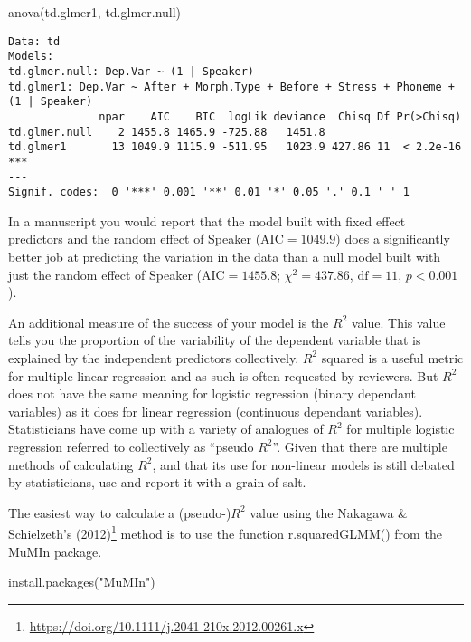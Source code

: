 \documentclass[
  10pt,
  letterpaper]{article}
\newenvironment{Shaded}{\begin{snugshade}}{\end{snugshade}}
\newcommand{\FunctionTok}[1]{\textcolor[rgb]{0.28,0.35,0.67}{#1}}
\newcommand{\NormalTok}[1]{\textcolor[rgb]{0.00,0.23,0.31}{#1}}
\newcommand{\StringTok}[1]{\textcolor[rgb]{0.13,0.47,0.30}{#1}}
\renewcommand\texttt[1]{{\ttfamily\color{BrickRed}#1}}
\DeclareRobustCommand{\href}[2]{#2\footnote{\url{#1}}}
\begin{document}
\begin{tcolorbox}
\begin{Shaded}
\begin{Highlighting}[]
\FunctionTok{anova}\NormalTok{(td.glmer1, td.glmer.null)}
\end{Highlighting}
\end{Shaded}

\begin{verbatim}
Data: td
Models:
td.glmer.null: Dep.Var ~ (1 | Speaker)
td.glmer1: Dep.Var ~ After + Morph.Type + Before + Stress + Phoneme + (1 | Speaker)
              npar    AIC    BIC  logLik deviance  Chisq Df Pr(>Chisq)    
td.glmer.null    2 1455.8 1465.9 -725.88   1451.8                         
td.glmer1       13 1049.9 1115.9 -511.95   1023.9 427.86 11  < 2.2e-16 ***
---
Signif. codes:  0 '***' 0.001 '**' 0.01 '*' 0.05 '.' 0.1 ' ' 1
\end{verbatim}

In a manuscript you would report that the model built with fixed effect
predictors and the random effect of \texttt{Speaker}
(\texttt{AIC}\(=1049.9\)) does a significantly better job at predicting
the variation in the data than a null model built with just the random
effect of \texttt{Speaker} (\texttt{AIC}\(=1455.8\); \(\chi^2=437.86\),
\(\text{df}=11\), \(p<0.001\)).

An additional measure of the success of your model is the \(R^2\) value.
This value tells you the proportion of the variability of the dependent
variable that is explained by the independent predictors collectively.
\(R^2\) squared is a useful metric for multiple linear regression and as
such is often requested by reviewers. But \(R^2\) does not have the same
meaning for logistic regression (binary dependant variables) as it does
for linear regression (continuous dependant variables). Statisticians
have come up with a variety of analogues of \(R^2\) for multiple
logistic regression referred to collectively as ``pseudo \(R^2\)''.
Given that there are multiple methods of calculating \(R^2\), and that
its use for non-linear models is still debated by statisticians, use and
report it with a grain of salt.

The easiest way to calculate a (pseudo-)\(R^2\) value using the
\href{https://doi.org/10.1111/j.2041-210x.2012.00261.x}{Nakagawa \&
Schielzeth's (2012)} method is to use the function
\texttt{r.squaredGLMM()} from the \texttt{MuMIn} package.

\begin{Shaded}
\begin{Highlighting}[]
\FunctionTok{install.packages}\NormalTok{(}\StringTok{"MuMIn"}\NormalTok{)}
\end{Highlighting}
\end{Shaded}


\end{tcolorbox}
\end{document}
